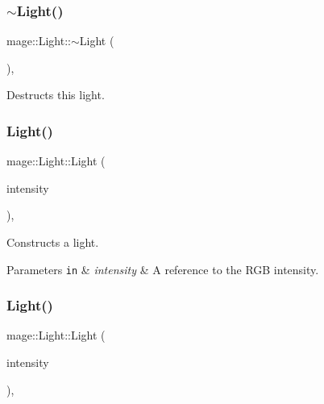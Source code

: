 \subsubsection{\texorpdfstring{$\sim$\+Light()}{~Light()}}
{\footnotesize\ttfamily mage\+::\+Light\+::$\sim$\+Light (\begin{DoxyParamCaption}{ }\end{DoxyParamCaption})\hspace{0.3cm}{\ttfamily [virtual]}, {\ttfamily [default]}}

Destructs this light. \hypertarget{classmage_1_1_light_ab470ad4bde2c1e27068541bb53accb0c}{}\label{classmage_1_1_light_ab470ad4bde2c1e27068541bb53accb0c} 
\subsubsection{\texorpdfstring{Light()}{Light()}\hspace{0.1cm}{\footnotesize\ttfamily [1/4]}}
{\footnotesize\ttfamily mage\+::\+Light\+::\+Light (\begin{DoxyParamCaption}\item[{const \hyperlink{structmage_1_1_r_g_b_spectrum}{R\+G\+B\+Spectrum} \&}]{intensity }\end{DoxyParamCaption})\hspace{0.3cm}{\ttfamily [explicit]}, {\ttfamily [protected]}}

Constructs a light.


\begin{DoxyParams}[1]{Parameters}
\mbox{\tt in}  & {\em intensity} & A reference to the R\+GB intensity. \\
\hline
\end{DoxyParams}
\hypertarget{classmage_1_1_light_aae4b7899b7709f658d0d061909e45cec}{}\label{classmage_1_1_light_aae4b7899b7709f658d0d061909e45cec} 
\subsubsection{\texorpdfstring{Light()}{Light()}\hspace{0.1cm}{\footnotesize\ttfamily [2/4]}}
{\footnotesize\ttfamily mage\+::\+Light\+::\+Light (\begin{DoxyParamCaption}\item[{\hyperlink{structmage_1_1_r_g_b_spectrum}{R\+G\+B\+Spectrum} \&\&}]{intensity }\end{DoxyParamCaption})\hspace{0.3cm}{\ttfamily [explicit]}, {\ttfamily [protected]}}

